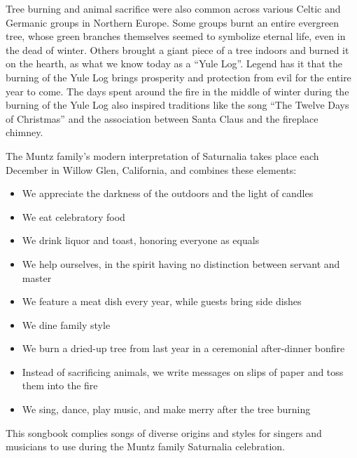 \documentclass{memoir}
\begin{document}
\begin{flushleft}
\par
Tree burning and animal sacrifice were also common across various Celtic and Germanic groups in Northern Europe.  Some groups burnt an entire evergreen tree, whose green branches themselves seemed to symbolize eternal life, even in the dead of winter. Others brought a giant piece of a tree indoors and burned it on the hearth, as what we know today as a ``Yule Log''. Legend has it that the burning of the Yule Log brings prosperity and protection from evil for the entire year to come. The days spent around the fire in the middle of winter during the burning of the Yule Log also inspired traditions like the song ``The Twelve Days of Christmas'' and the association between Santa Claus and the fireplace chimney.

\par
The Muntz family's modern interpretation of Saturnalia takes place each December in Willow Glen, California, and combines these elements:
\begin{itemize}
\item We appreciate the darkness of the outdoors and the light of candles
\item We eat celebratory food
\item We drink liquor and toast, honoring everyone as equals
\item We help ourselves, in the spirit having no distinction between servant and master
\item We feature a meat dish every year, while guests bring side dishes
\item We dine family style
\item We burn a dried-up tree from last year in a ceremonial after-dinner bonfire
\item Instead of sacrificing animals, we write messages on slips of paper and toss them into the fire
\item We sing, dance, play music, and make merry after the tree burning
\end{itemize}

\par
This songbook complies songs of diverse origins and styles for singers and musicians to use during the Muntz family Saturnalia celebration.  


\end{flushleft}
\end{document}

